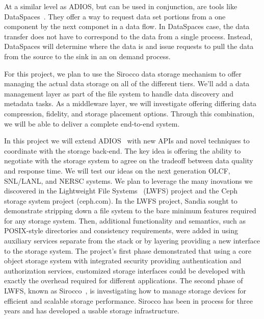 At a similar level as ADIOS, but can be used in conjunction, are tools like
DataSpaces~\cite{dataspaces}. They offer a way to request data set portions
from a one component by the next componet in a data flow. In DataSpaces case,
the data transfer does not have to correspond to the data from a single
process.  Instead, DataSpaces will determine where the data is and issue
requests to pull the data from the source to the sink in an on demand process.

For this project, we plan to use the Sirocco data storage mechanism to
offer managing the actual data storage on all of the different tiers. We'll add
a data management layer as part of the file system to handle data discovery and
metadata tasks. As a middleware layer, we will investigate offering differing
data compression, fidelity, and storage placement options. Through this 
combination, we will be able to deliver a complete end-to-end system.

In this project we will extend ADIOS~\cite{adios} with new APIs and novel techniques
to coordinate with the storage back-end. The key idea is offering the ability to
negotiate with the storage system to agree on the tradeoff between data quality
and response time. We will test our ideas on the next generation OLCF,
SNL/LANL, and NERSC systems.
%
We plan to leverage the many inovations we discovered in 
the Lightweight File Systems~\cite{lwfs} (LWFS) project and the Ceph storage system project (ceph.com).
In the LWFS project, Sandia sought to
demonstrate stripping down a file system to the bare minimum features required
for any storage system. Then, additional functionality and semantics, such as
POSIX-style directories and consistency requirements, were added in using
auxiliary services separate from the stack or by layering providing a new
interface to the storage system. The project's first phase demonstrated that
using a core object storage system with integrated security providing
authentication and authorization services, customized storage interfaces could
be developed with exactly the overhead required for different applications. The
second phase of LWFS, known as Sirocco~\cite{sirocco}, is investigating how to
manage storage devices for efficient and scalable storage performance.  Sirocco
has been in process for three years and has developed a usable storage infrastructure.

